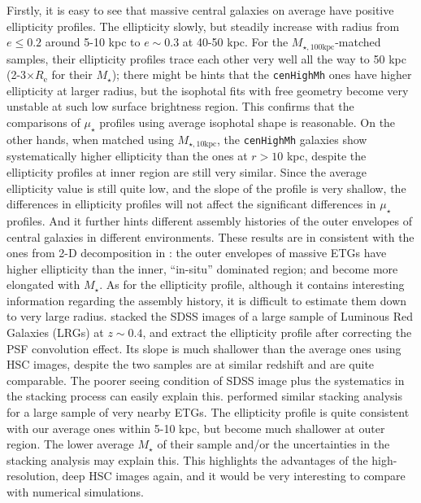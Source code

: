 \documentclass{emulateapj}
\def\rbcg{\texttt{cenHighMh}}
\def\mstar{{$M_{\star}$}}
\def\minn{{$M_{\star,10\mathrm{kpc}}$}}
\def\mtot{{$M_{\star,100\mathrm{kpc}}$}}
\def\mden{{$\mu_{\star}$}}
\newcommand{\update}[1]{\textcolor{Bittersweet}{#1}}
\begin{document}
\begin{CJK*}{UTF8}{gbsn}
    \update{
    Firstly, it is easy to see that massive central galaxies on average have positive 
    ellipticity profiles. 
    The ellipticity slowly, but steadily increase with radius from $e\le 0.2$ around 
    5-10 kpc to $e\sim 0.3$ at 40-50 kpc.  
    For the \mtot{}-matched samples, their ellipticity profiles trace each other 
    very well all the way to 50 kpc (2-3$\times R_{\mathrm{e}}$ for their \mstar{}); 
    there might be hints that the \rbcg{} ones have higher ellipticity at larger 
    radius, but the isophotal fits with free geometry become very unstable at such 
    low surface brightness region. 
    This confirms that the comparisons of \mden{} profiles using average isophotal 
    shape is reasonable. 
    On the other hands, when matched using \minn{}, the \rbcg{} galaxies show 
    systematically higher ellipticity than the \ncbg{} ones at $r > 10$ kpc, despite 
    the ellipticity profiles at inner region are still very similar. 
    Since the average ellipticity value is still quite low, and the slope of the 
    profile is very shallow, the differences in ellipticity profiles will not affect 
    the significant differences in \mden{} profiles. 
    And it further hints different assembly histories of the outer envelopes of
    central galaxies in different environments. 
    These results are in consistent with the ones from 2-D decomposition in
    \citep{Huang2013a}: the outer envelopes of massive ETGs have higher ellipticity 
    than the inner, ``in-situ'' dominated region; and become more elongated with 
    \mstar{}. 
    As for the ellipticity profile, although it contains interesting information 
    regarding the assembly history, it is difficult to estimate them down to very 
    large radius. 
    \citet{Tal2011} stacked the SDSS images of a large sample of Luminous Red 
    Galaxies (LRGs) at $z\sim 0.4$, and extract the ellipticity profile after 
    correcting the PSF convolution effect.   
    Its slope is much shallower than the average ones using HSC images, despite the 
    two samples are at similar redshift and are quite comparable. 
    The poorer seeing condition of SDSS image plus the systematics in the stacking 
    process can easily explain this. 
    \citet{DSouza2015} performed similar stacking analysis for a large sample of very 
    nearby ETGs.  
    The ellipticity profile is quite consistent with our average ones within 5-10 
    kpc, but become much shallower at outer region.  
    The lower average \mstar{} of their sample and/or the uncertainties in the 
    stacking analysis may explain this.  
    This highlights the advantages of the high-resolution, deep HSC images again,
    and it would be very interesting to compare with numerical simulations. 
    }
    

\end{CJK*}
\end{document}

